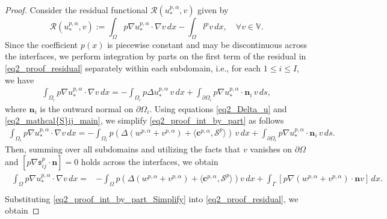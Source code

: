 \documentclass[oneside]{article}
\begin{document}
\begin{proof}
Consider the residual functional $\mathcal{R}(u^{p, \alpha}_*, v)$ given by
\begin{equation} \label{eq2_proof_residual}
\mathcal{R}(u^{p, \alpha}_*, v) := \int_\Omega p \nabla u^{p, \alpha}_* \cdot \nabla v \, dx - \int_\Omega l^p v \, dx, \quad \forall v \in \mathbb{V}.
\end{equation}
Since the coefficient $p(x)$ is piecewise constant and may be discontinuous across the interfaces, we perform integration by parts on the first term of the residual in \eqref{eq2_proof_residual} separately within each subdomain, i.e., for each $1\leq i\leq I$, we have
\begin{align}\label{eq2_proof_int_by_part}
\int_{\Omega_i} p \nabla u^{p, \alpha}_* \cdot \nabla v \, dx = - \int_{\Omega_i} p \Delta u^{p, \alpha}_* \, v \, dx + \int_{\partial \Omega_i} p \nabla u^{p, \alpha}_* \cdot \mathbf{n}_i \, v \, ds,
\end{align}
where $\mathbf{n}_i$ is the outward normal on $\partial \Omega_i$. Using equations \eqref{eq2_Delta_u} and \eqref{eq2_mathcal{S}ij_main}, we simplify \eqref{eq2_proof_int_by_part} as follows
\begin{align}
\int_{\Omega_i} p \nabla u^{p, \alpha}_* \cdot \nabla v \, dx
=  - \int_{\Omega_i} p \left( \Delta (w^{p, \alpha} + v^{p, \alpha}) + \langle \mathbf{c}^{p, \alpha}, \mathcal{S}^p \rangle \right)\, v \, dx + \int_{\partial \Omega_i} p \nabla  u^{p, \alpha}_* \cdot \mathbf{n}_i \, v \, ds.
\end{align}
Then, summing over all subdomains and utilizing the facts that $v$ vanishes on $\partial \Omega$ and $\left[p\nabla \mathfrak {s}^p_{ij}\cdot \mathbf{n}\right]=0$ holds across the interfaces, we obtain 
\begin{align}\label{eq2_proof_int_by_part_Simplify}
\begin{array}{rl}
    \displaystyle \int_{\Omega} p \nabla u^{p, \alpha}_* \cdot \nabla v \, dx
    =  & \displaystyle - \int_{\Omega} p \left( \Delta (w^{p, \alpha} + v^{p, \alpha}) + \langle \mathbf{c}^{p, \alpha}, \mathcal{S}^p \rangle \right) v \, dx  +\int_{\Gamma}[ p \nabla  (w^{p, \alpha} + v^{p, \alpha}) \cdot \mathbf{n}v]\, dx.\\
\end{array}
\end{align}
Substituting \eqref{eq2_proof_int_by_part_Simplify} into \eqref{eq2_proof_residual}, we obtain

\end{proof}
\end{document}
